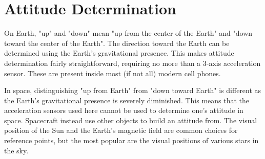 \section{Attitude Determination}
On Earth, "up" and "down" mean "up from the center of the Earth" and "down toward the center of the Earth". The direction toward the Earth can be determined using the Earth's gravitational presence. This makes attitude determination fairly straightforward, requiring no more than a 3-axis acceleration sensor. These are present inside most (if not all) modern cell phones. 

In space, distinguishing "up from Earth" from "down toward Earth" is different as the Earth's gravitational presence is severely diminished. This means that the acceleration sensors used here cannot be used to determine one's attitude in space. Spacecraft instead use other objects to build an attitude from. The visual position of the Sun and the Earth's magnetic field are common choices for reference points, but the most popular are the visual positions of various stars in the sky. 

\begin{figure}
\label{coordinatesystems}
\end{figure}

